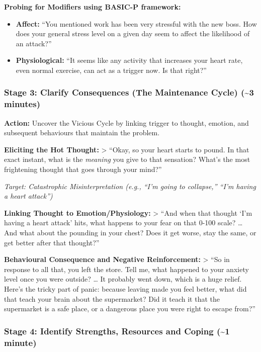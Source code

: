 \documentclass[
  american,
  letterpaper,
  DIV=11,
  numbers=noendperiod]{scrartcl}
\providecommand{\tightlist}{%
  \setlength{\itemsep}{0pt}\setlength{\parskip}{0pt}}
\begin{document}
\textbf{Probing for Modifiers using BASIC-P framework:}

\begin{itemize}
\tightlist
\item
  \textbf{Affect:} ``You mentioned work has been very stressful with the
  new boss. How does your general stress level on a given day seem to
  affect the likelihood of an attack?''
\item
  \textbf{Physiological:} ``It seems like any activity that increases
  your heart rate, even normal exercise, can act as a trigger now. Is
  that right?''
\end{itemize}

\subsubsection{Stage 3: Clarify Consequences (The Maintenance Cycle)
(\textasciitilde3
minutes)}\label{stage-3-clarify-consequences-the-maintenance-cycle-3-minutes}

\textbf{Action:} Uncover the Vicious Cycle by linking trigger to
thought, emotion, and subsequent behaviours that maintain the problem.

\textbf{Eliciting the Hot Thought:} \textgreater{} ``Okay, so your heart
starts to pound. In that exact instant, what is the \emph{meaning} you
give to that sensation? What's the most frightening thought that goes
through your mind?''

\emph{Target: Catastrophic Misinterpretation (e.g., ``I'm going to
collapse,'' ``I'm having a heart attack'')}

\textbf{Linking Thought to Emotion/Physiology:} \textgreater{} ``And
when that thought `I'm having a heart attack' hits, what happens to your
fear on that 0-100 scale? \ldots{} And what about the pounding in your
chest? Does it get worse, stay the same, or get better after that
thought?''

\textbf{Behavioural Consequence and Negative Reinforcement:}
\textgreater{} ``So in response to all that, you left the store. Tell
me, what happened to your anxiety level once you were outside? \ldots{}
It probably went down, which is a huge relief. Here's the tricky part of
panic: because leaving made you feel better, what did that teach your
brain about the supermarket? Did it teach it that the supermarket is a
safe place, or a dangerous place you were right to escape from?''

\subsubsection{Stage 4: Identify Strengths, Resources and Coping
(\textasciitilde1
minute)}\label{stage-4-identify-strengths-resources-and-coping-1-minute}
\end{document}
